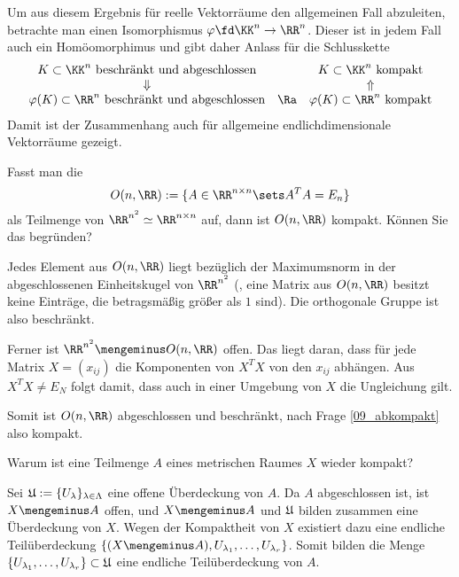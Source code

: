 \begin{antwort}
  Um aus diesem Ergebnis für reelle Vektorräume den 
  allgemeinen Fall abzuleiten, betrachte man einen Isomorphismus 
  $\varphi \fd \KK^n \to \RR^n$. Dieser ist in jedem 
  Fall auch ein Homöomorphimus und gibt daher Anlass für die Schlusskette
  \[
  \begin{array}{ccc}
    \text{$K \subset \KK^n$ beschränkt und abgeschlossen} 
    &  & \text{$K\subset \KK^n$ kompakt} \\
    \Downarrow & & \Uparrow \\
    \text{$\varphi(K)\subset\RR^n$ beschränkt und abgeschlossen} & \Ra & 
    \text{$\varphi(K)\subset\RR^n$ kompakt} 
  \end{array}
  \]
  Damit ist der Zusammenhang auch für allgemeine endlichdimensionale 
  Vektorräume gezeigt.
  \AntEnd
\end{antwort}

\begin{frage}
  Fasst man die   
  \[
  O(n,\RR) := \{ A \in \RR^{n\times n} \sets A^T A = E_n \} 
  \]
  als Teilmenge von $\RR^{n^2} \simeq \RR^{n\times n}$ auf, dann 
  ist $O(n,\RR)$ kompakt. Können Sie das begründen?
\end{frage}

\begin{antwort}
  Jedes Element aus $O(n,\RR)$ liegt 
  bezüglich der Maximumsnorm in der abgeschlossenen 
  Einheitskugel von $\RR^{n^2}$ ({\dasheisst}, 
  eine Matrix aus $O(n,\RR)$ besitzt keine Einträge, die 
  betragsmäßig größer als $1$ sind). Die orthogonale 
  Gruppe ist also beschränkt. 

  Ferner ist $\RR^{n^2}\mengeminus O(n,\RR)$ offen. Das liegt 
  daran, dass für jede Matrix $X = (x_{ij})$ die Komponenten 
  von $X^T X$  von den $x_{ij}$ abhängen. 
  Aus $X^T X \not=E_N$ folgt damit, dass auch in einer Umgebung 
  von $X$ die Ungleichung gilt.  

  Somit ist $O(n,\RR)$ abgeschlossen und beschränkt, nach Frage 
  \ref{09_abkompakt} also kompakt.\AntEnd
\end{antwort}

\begin{frage}
  Warum ist eine  Teilmenge $A$ eines 
   metrischen Raumes $X$ wieder kompakt?
\end{frage}

\begin{antwort}
  Sei $\frak{U} := \{ U_\lambda \}_{\lambda \in \Lambda}$ eine offene 
  Überdeckung von $A$. 
  Da $A$ abgeschlossen ist, ist $X\mengeminus A$ offen, 
  und $X \mengeminus A$ und $\frak{U}$ bilden zusammen eine Überdeckung  
  von $X$. Wegen der Kompaktheit von $X$ existiert dazu eine endliche 
  Teilüberdeckung 
  $\{ (X \mengeminus A),  U_{\lambda_1}, \ldots , U_{\lambda_r} \}$. 
  Somit bilden die Menge 
  $\{ U_{\lambda_1}, \ldots, U_{\lambda_r} \} \subset \frak{U}$ 
  eine endliche Teilüberdeckung von $A$.
  \AntEnd
\end{antwort}

